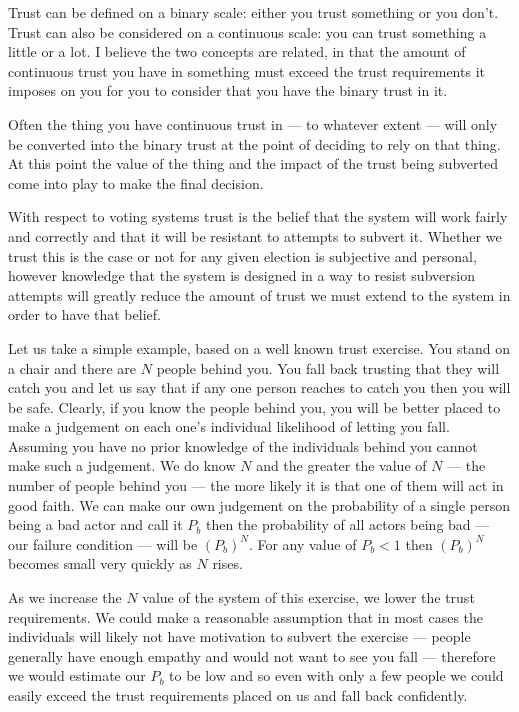 Trust can be defined on a binary scale: either you trust something or you don't. Trust can also be considered on a continuous scale: you can trust something a little or a lot. I believe the two concepts are related, in that the amount of continuous trust you have in something must exceed the trust requirements it imposes on you for you to consider that you have the binary trust in it.

Often the thing you have continuous trust in --- to whatever extent --- will only be converted into the binary trust at the point of deciding to rely on that thing. At this point the value of the thing and the impact of the trust being subverted come into play to make the final decision.

With respect to voting systems trust is the belief that the system will work fairly and correctly and that it will be resistant to attempts to subvert it. Whether we trust this is the case or not for any given election is subjective and personal, however knowledge that the system is designed in a way to resist subversion attempts will greatly reduce the amount of trust we must extend to the system in order to have that belief.

Let us take a simple example, based on a well known trust exercise. You stand on a chair and there are $N$ people behind you. You fall back trusting that they will catch you and let us say that if any one person reaches to catch you then you will be safe. Clearly, if you know the people behind you, you will be better placed to make a judgement on each one's individual likelihood of letting you fall. Assuming you have no prior knowledge of the individuals behind you cannot make such a judgement. We do know $N$ and the greater the value of $N$ --- the number of people behind you --- the more likely it is that one of them will act in good faith. We can make our own judgement on the probability of a single person being a bad actor and call it $P_b$ then the probability of all actors being bad --- our failure condition --- will be $(P_b)^N$. For any value of $P_b < 1$ then $(P_b)^N$ becomes small very quickly as $N$ rises.

As we increase the $N$ value of the system of this exercise, we lower the trust requirements. We could make a reasonable assumption that in most cases the individuals will likely not have motivation to subvert the exercise --- people generally have enough empathy and would not want to see you fall --- therefore we would estimate our $P_b$ to be low and so even with only a few people we could easily exceed the trust requirements placed on us and fall back confidently.


